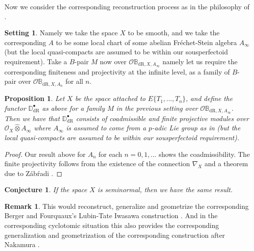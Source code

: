 \documentclass[12pt]{amsart}
\newtheorem{proposition}[theorem]{Proposition}
\newtheorem{conjecture}[theorem]{Conjecture}
\theoremstyle{definition}
\newtheorem{remark}[theorem]{Remark}
\numberwithin{equation}{section}
\newtheorem{setting}[theorem]{Setting}
\begin{document}
\indent Now we consider the corresponding reconstruction process as in the philosophy of \cite{KP}. 

\begin{setting}
Namely we take the space $X$ to be smooth, and we take the corresponding $A$ to be some local chart of some abelian Fr\'echet-Stein algebra $A_\infty$ (but the local quasi-compacts are assumed to be within our sousperfectoid requirement). Take a $B$-pair $M$ now over $\mathcal{O}\mathbb{B}_{\mathrm{dR},X,A_\infty}$ namely let us require the corresponding finiteness and projectivity at the infinite level, as a family of $B$-pair over $\mathcal{O}\mathbb{B}_{\mathrm{dR},X,A_n}$ for all $n$.
\end{setting}


\begin{proposition}
Let $X$ be the space attached to $E\{T_1,...,T_n\}$, and define the functor $\mathbb{D}^\bullet_\mathrm{dR}$ as above for a family $M$ in the previous setting over $\mathcal{O}\mathbb{B}_{\mathrm{dR},X,A_\infty}$. Then we have that $\mathbb{D}^\bullet_\mathrm{dR}$ consists of coadmissible and finite projective modules over $\mathcal{O}_X\widehat{\otimes}A_\infty$ where $A_\infty$ is assumed to come from a $p$-adic Lie group as in \cite[Theorem 3.10]{Z1} (but the local quasi-compacts are assumed to be within our sousperfectoid requirement).
\end{proposition}

\begin{proof}
Our result above for $A_n$ for each $n=0,1,...$ shows the coadmissibility. The finite projectivity follows from the existence of the connection $\nabla_X$ and a theorem due to Z\'ab\'radi \cite[Theorem 3.10]{Z1}.	
\end{proof}


\begin{conjecture}
If the space $X$ is seminormal, then we have the same result.
\end{conjecture}



\begin{remark}
This would reconstruct, generalize and geometrize the corresponding Berger and Fourquaux's Lubin-Tate Iwasawa construction \cite{Berger}. And in the corresponding cyclotomic situation this also provides the corresponding generalization and geometrization of the corresponding construction after Nakamura \cite{Nakamura1}.	
\end{remark}
\end{document}
